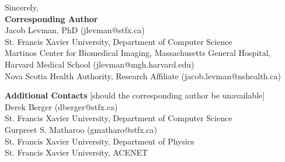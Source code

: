 \documentclass[10pt,letter]{article}
\begin{document}
\bigskip

\noindent
Sincerely, \\

\small
\noindent
\textbf{Corresponding Author}\\
Jacob Levman, PhD (jlevman@stfx.ca) \\
\footnotesize
\hspace*{0.25cm}St. Francis Xavier University, Department of Computer Science  \\
\hspace*{0.25cm}Martinos Center for Biomedical Imaging, Massachusetts General Hospital, Harvard Medical School (jlevman@mgh.harvard.edu) \\
\hspace*{0.25cm}Nova Scotia Health Authority, Research Affiliate (jacob.levman@nshealth.ca) \\
\normalsize

\small
\noindent
\textbf{Additional Contacts} [should the corresponding author be unavailable]\\
Derek Berger (dberger@stfx.ca)\\
\footnotesize
\hspace*{0.25cm} St. Francis Xavier University, Department of Computer Science \\
\small
Gurpreet S. Matharoo (gmatharo@stfx.ca) \\
\footnotesize
\hspace*{0.25cm} St. Francis Xavier University, Department of Physics \\
\hspace*{0.25cm} St. Francis Xavier University, ACENET
\normalsize






% 
\end{document}
